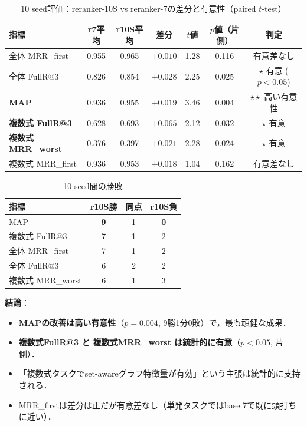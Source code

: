 \documentclass[11pt,a4paper]{ltjsarticle}
\begin{document}
\begin{table}[h]
\centering
\caption{10 seed評価：reranker-10S vs reranker-7の差分と有意性（paired $t$-test）}
\small
\begin{tabular}{lcccccc}
\toprule
指標 & r7平均 & r10S平均 & 差分 & $t$値 & $p$値（片側） & 判定 \\
\midrule
全体 MRR\_first & 0.955 & 0.965 & $+0.010$ & 1.28 & 0.116 & 有意差なし \\
全体 FullR@3 & 0.826 & 0.854 & $+0.028$ & 2.25 & $0.025$ & $\star$ 有意 ($p<0.05$) \\
\textbf{MAP} & 0.936 & 0.955 & $+0.019$ & 3.46 & $\mathbf{0.004}$ & $\star\star$ 高い有意性 \\
\textbf{複数式 FullR@3} & 0.628 & 0.693 & $\mathbf{+0.065}$ & 2.12 & $0.032$ & $\star$ 有意 \\
\textbf{複数式 MRR\_worst} & 0.376 & 0.397 & $+0.021$ & 2.28 & $0.024$ & $\star$ 有意 \\
複数式 MRR\_first & 0.936 & 0.953 & $+0.018$ & 1.04 & 0.162 & 有意差なし \\
\bottomrule
\end{tabular}
\end{table}

\begin{table}[h]
\centering
\caption{10 seed間の勝敗}
\small
\begin{tabular}{lccc}
\toprule
指標 & r10S勝 & 同点 & r10S負 \\
\midrule
MAP & \textbf{9} & 1 & \textbf{0} \\
複数式 FullR@3 & 7 & 1 & 2 \\
全体 MRR\_first & 7 & 1 & 2 \\
全体 FullR@3 & 6 & 2 & 2 \\
複数式 MRR\_worst & 6 & 1 & 3 \\
\bottomrule
\end{tabular}
\end{table}

\textbf{結論}：
\begin{itemize}[leftmargin=2em, nosep]
  \item \textbf{MAPの改善は高い有意性}（$p=0.004$, 9勝1分0敗）で，最も頑健な成果．
  \item \textbf{複数式FullR@3 と 複数式MRR\_worst は統計的に有意}（$p < 0.05$, 片側）．
  \item 「複数式タスクでset-awareグラフ特徴量が有効」という主張は統計的に支持される．
  \item MRR\_firstは差分は正だが有意差なし（単発タスクではbase 7で既に頭打ちに近い）．
\end{itemize}
\end{document}
